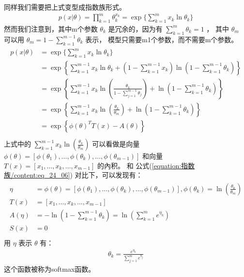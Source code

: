\documentclass[letterpaper,10pt,english]{sphinxmanual}
\begin{document}
同样我们需要把上式变型成指数族形式。
\begin{equation}\label{equation:指数族/content:指数族/content:7}
\begin{split}p(x|\theta) = \prod_{k=1}^m \theta_k^{x_k}= \exp \{ \sum_{k=1}^m x_k \ln \theta_k \}\end{split}
\end{equation}
然而我们注意到，其中m个参数 \(\theta_k\) 是冗余的，因为有 \(\sum_{k=1}^m \theta_k=1\) ，
其中 \(\theta_m\) 可以用 \(\theta_m=1-\sum_{k=1}^{m-1} \theta_k\) 表示，
模型只需要m\sphinxhyphen{}1个参数，而不需要m个参数。
\begin{align}\label{equation:指数族/content:指数族/content:8}\!\begin{aligned}
p(x|\theta) &=  \exp \{ \sum_{k=1}^m x_k \ln \theta_k \}\\
&=  \exp \left \{ \sum_{k=1}^{m-1} x_k \ln \theta_k  +
\left (1-\sum_{k=1}^{m-1} x_k \right ) \ln \left (1-\sum_{k=1}^{m-1} \theta_k \right )   \right \}\\
&= \exp \left \{ \sum_{k=1}^{m-1} x_k \ln \left ( \frac{\theta_k}{1-\sum_{j=1}^{m-1} \theta_j} \right )
+ \ln \left  (1-\sum_{k=1}^{m-1} \theta_k \right ) \right \}\\
&= \exp \left \{ \sum_{k=1}^{m-1} x_k \ln \left ( \frac{\theta_k}{ \theta_m} \right )
+ \ln \left  (1-\sum_{k=1}^{m-1} \theta_k \right ) \right \}\\
&= \exp \left \{ \phi(\theta)^T T(x) - A(\theta) \right \}\\
\end{aligned}\end{align}
上式中的 \(\sum_{k=1}^{m-1} x_k \ln \left ( \frac{\theta_k}{ \theta_m} \right )\)
可以看做是向量 \(\phi(\theta) = [\phi(\theta_1),\dots,\phi(\theta_k),\dots,\phi(\theta_{m-1})]\)
和向量 \(T(x)=[x_1,\dots,x_k,\dots,x_{m-1}]\) 的內积。
和 公式(\ref{equation:指数族/content:eq_24_06}) 对比下，可以发现有：
\begin{align}\label{equation:指数族/content:指数族/content:9}\!\begin{aligned}
\eta &= \phi(\theta) = [\phi(\theta_1),\dots,\phi(\theta_k),\dots,\phi(\theta_{m-1})]
,\phi(\theta_k) = \ln \left ( \frac{\theta_k}{ \theta_m} \right )\\
T(x)&=[x_1,\dots,x_k,\dots,x_{m-1}]\\
A(\eta) &= - \ln \left  (1-\sum_{k=1}^{m-1} \theta_k \right )
= \ln \left (  \sum_{k=1}^m e^{\eta_k}  \right )\\
S(x) &= 0\\
\end{aligned}\end{align}
用 \(\eta\) 表示 \(\theta\) 有：
\begin{equation}\label{equation:指数族/content:指数族/content:10}
\begin{split}\theta_k = \frac{e^{\eta_k}}{\sum_{j=1}^m e^{\eta_j}}\end{split}
\end{equation}
这个函数被称为softmax函数。
\end{document}
